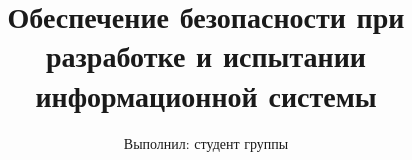 


\title{Обеспечение безопасности при разработке и испытании информационной системы}
\author{Выполнил: студент группы \mygroup{} \me{}}
\date{}



\maketitle






